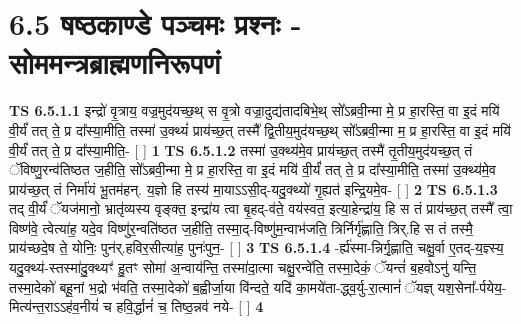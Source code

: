 \documentclass[17pt]{extarticle}
\begin{document}
     \section*{ 6.5      षष्ठकाण्डे पञ्चमः प्रश्नः - सोममन्त्रब्राह्मणनिरूपणं }
                                        \textbf{ TS 6.5.1.1} \newline
                  इन्द्रो॑ वृ॒त्राय॒ वज्र॒मुद॑यच्छ॒थ् स वृ॒त्रो वज्रा॒दुद्य॑तादबिभे॒थ् सो᳚ऽब्रवी॒न्मा मे॒ प्र हा॒रस्ति॒ वा इ॒दं मयि॑ वी॒र्यं॑ तत् ते॒ प्र दा᳚स्या॒मीति॒ तस्मा॑ उ॒क्थ्यं॑ प्राय॑च्छ॒त् तस्मै᳚ द्वि॒तीय॒मुद॑यच्छ॒थ् सो᳚ऽब्रवी॒न्मा म॒ प्र हा॒रस्ति॒ वा इ॒दं मयि॑ वी॒र्यं॑ तत् ते॒ प्र दा᳚स्या॒मीति॒- [  ] \textbf{  1 } \newline
                  \newline
                                \textbf{ TS 6.5.1.2} \newline
                  तस्मा॑ उ॒क्थ्य॑मे॒व प्राय॑च्छ॒त् तस्मै॑ तृ॒तीय॒मुद॑यच्छ॒त् तं ॅविष्णु॒रन्व॑तिष्ठत ज॒हीति॒ सो᳚ऽब्रवी॒न्मा मे॒ प्र हा॒रस्ति॒ वा इ॒दं मयि॑ वी॒र्यं॑ तत् ते॒ प्र दा᳚स्या॒मीति॒ तस्मा॑ उ॒क्थ्य॑मे॒व प्राय॑च्छ॒त् तं निर्मा॑यं भू॒तम॑हन्. य॒ज्ञो हि तस्य॑ मा॒याऽऽसी॒द्-यदु॒क्थ्यो॑ गृ॒ह्यत॑ इन्द्रि॒यमे॒व- [  ] \textbf{  2} \newline
                  \newline
                                \textbf{ TS 6.5.1.3} \newline
                  तद् वी॒र्यं॑ ॅयज॑मानो॒ भ्रातृ॑व्यस्य वृङ्क्त॒ इन्द्रा॑य त्वा बृ॒हद्-व॑ते॒ वय॑स्वत॒ इत्या॒हेन्द्रा॑य॒ हि स तं प्राय॑च्छ॒त् तस्मै᳚ त्वा॒ विष्ण॑वे॒ त्वेत्या॑ह॒ यदे॒व विष्णु॑र॒न्वति॑ष्ठत ज॒हीति॒ तस्मा॒द्-विष्णु॑म॒न्वाभ॑जति॒ त्रिर्निर्गृ॑ह्णाति॒ त्रिर्.हि स तं तस्मै॒ प्राय॑च्छदे॒ष ते॒ योनिः॒ पुन॑र्.हविर॒सीत्या॑ह॒ पुनः॑पुन॒- [  ] \textbf{  3} \newline
                  \newline
                                \textbf{ TS 6.5.1.4} \newline
                  -र्ह्य॑स्मा-न्निर्गृ॒ह्णाति॒ चक्षु॒र्वा ए॒तद्-य॒ज्ञ्स्य॒ यदु॒क्थ्य॑-स्तस्मा॑दु॒क्थ्यꣳ॑ हु॒तꣳ सोमा॑ अ॒न्वाय॑न्ति॒ तस्मा॑दा॒त्मा चक्षु॒रन्वे॑ति॒ तस्मा॒देकं॒ ॅयन्तं॑ ब॒हवोऽनु॑ यन्ति॒ तस्मा॒देको॑ बहू॒नां भ॒द्रो भ॑वति॒ तस्मा॒देको॑ ब॒ह्वीर्जा॒या वि॑न्दते॒ यदि॑ का॒मये॑ता-द्ध्व॒र्यु-रा॒त्मानं॑ ॅयज्ञ् यश॒सेना᳚-र्पयेय॒-मित्य॑न्त॒राऽऽह॑व॒नीयं॑ च हवि॒र्द्धानं॑ च॒ तिष्ठ॒न्नव॑ नये- [  ] \textbf{  4} \newline
\end{document}
